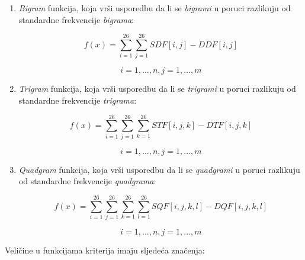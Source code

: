 \documentclass[12pt, a4paper]{article}
\begin{document}
\begin{enumerate}

\item \textit{Bigram} funkcija, koja vrši usporedbu da li se \textit{bigrami} u poruci razlikuju od standardne frekvencije \textit{bigrama}:

\begin{equation}
f(x) = \sum_{i = 1}^{26}{\sum_{j = 1}^{26}{SDF[i, j] - DDF[i, j]}}
\end{equation}

\begin{equation*}
i = 1, ..., n, j = 1, ..., m
\end{equation*}

\item \textit{Trigram} funkcija, koja vrši usporedbu da li se \textit{trigrami} u poruci razlikuju od standardne frekvencije \textit{trigrama}:

\begin{equation}
f(x) = \sum_{i = 1}^{26}{\sum_{j = 1}^{26}{\sum_{k = 1}^{26}{STF[i, j, k] - DTF[i, j, k]}}}
\end{equation}

\begin{equation*}
i = 1, ..., n, j = 1, ..., m
\end{equation*}

\item \textit{Quadgram} funkcija, koja vrši usporedbu da li se \textit{quadgrami} u poruci razlikuju od standardne frekvencije \textit{quadgrama}:

\begin{equation}
f(x) = \sum_{i = 1}^{26}{\sum_{j = 1}^{26}{\sum_{k = 1}^{26}{\sum_{l = 1}^{26}{SQF[i, j, k, l] - DQF[i, j, k, l]}}}}
\end{equation}

\begin{equation*}
i = 1, ..., n, j = 1, ..., m
\end{equation*}

\end{enumerate}

Veličine u funkcijama kriterija imaju sljedeća značenja:
\end{document}
